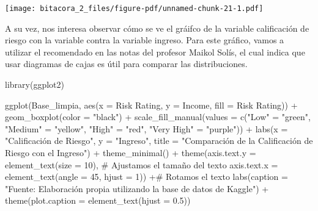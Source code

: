 \documentclass[
  letterpaper,
  DIV=11,
  numbers=noendperiod]{scrreprt}
\newenvironment{Shaded}{\begin{snugshade}}{\end{snugshade}}
\newcommand{\AttributeTok}[1]{\textcolor[rgb]{0.40,0.45,0.13}{#1}}
\newcommand{\CommentTok}[1]{\textcolor[rgb]{0.37,0.37,0.37}{#1}}
\newcommand{\DecValTok}[1]{\textcolor[rgb]{0.68,0.00,0.00}{#1}}
\newcommand{\FloatTok}[1]{\textcolor[rgb]{0.68,0.00,0.00}{#1}}
\newcommand{\FunctionTok}[1]{\textcolor[rgb]{0.28,0.35,0.67}{#1}}
\newcommand{\NormalTok}[1]{\textcolor[rgb]{0.00,0.23,0.31}{#1}}
\newcommand{\OtherTok}[1]{\textcolor[rgb]{0.00,0.23,0.31}{#1}}
\newcommand{\SpecialCharTok}[1]{\textcolor[rgb]{0.37,0.37,0.37}{#1}}
\newcommand{\StringTok}[1]{\textcolor[rgb]{0.13,0.47,0.30}{#1}}
\begin{document}
\texttt{[image: bitacora\_2\_files/figure-pdf/unnamed-chunk-21-1.pdf]}

A su vez, nos interesa observar cómo se ve el gráifco de la variable
calificación de riesgo con la variable contra la variable ingreso. Para
este gráfico, vamos a utilizar el recomendado en las notas del profesor
Maikol Solís, el cual indica que usar diagramas de cajas es útil para
comparar las distribuciones.

\begin{Shaded}
\begin{Highlighting}[]
\FunctionTok{library}\NormalTok{(ggplot2)}

\FunctionTok{ggplot}\NormalTok{(Base\_limpia, }\FunctionTok{aes}\NormalTok{(}\AttributeTok{x =} \StringTok{\textasciigrave{}}\AttributeTok{Risk Rating}\StringTok{\textasciigrave{}}\NormalTok{, }\AttributeTok{y =}\NormalTok{ Income, }\AttributeTok{fill =} \StringTok{\textasciigrave{}}\AttributeTok{Risk Rating}\StringTok{\textasciigrave{}}\NormalTok{)) }\SpecialCharTok{+}  
  \FunctionTok{geom\_boxplot}\NormalTok{(}\AttributeTok{color =} \StringTok{"black"}\NormalTok{) }\SpecialCharTok{+}  
  \FunctionTok{scale\_fill\_manual}\NormalTok{(}\AttributeTok{values =} \FunctionTok{c}\NormalTok{(}\StringTok{"Low"} \OtherTok{=} \StringTok{"green"}\NormalTok{, }\StringTok{"Medium"} \OtherTok{=} \StringTok{"yellow"}\NormalTok{, }\StringTok{"High"} \OtherTok{=} \StringTok{"red"}\NormalTok{, }\StringTok{"Very High"} \OtherTok{=} \StringTok{"purple"}\NormalTok{)) }\SpecialCharTok{+}  
  \FunctionTok{labs}\NormalTok{(}\AttributeTok{x =} \StringTok{"Calificación de Riesgo"}\NormalTok{, }\AttributeTok{y =} \StringTok{"Ingreso"}\NormalTok{, }\AttributeTok{title =} \StringTok{"Comparación de la Calificación de Riesgo con el Ingreso"}\NormalTok{) }\SpecialCharTok{+} 
  \FunctionTok{theme\_minimal}\NormalTok{() }\SpecialCharTok{+}
  \FunctionTok{theme}\NormalTok{(}\AttributeTok{axis.text.y =} \FunctionTok{element\_text}\NormalTok{(}\AttributeTok{size =} \DecValTok{10}\NormalTok{), }\CommentTok{\# Ajustamos el tamaño del texto}
        \AttributeTok{axis.text.x =} \FunctionTok{element\_text}\NormalTok{(}\AttributeTok{angle =} \DecValTok{45}\NormalTok{, }\AttributeTok{hjust =} \DecValTok{1}\NormalTok{))  }\SpecialCharTok{+}\CommentTok{\# Rotamos el texto}
  \FunctionTok{labs}\NormalTok{(}\AttributeTok{caption =} \StringTok{"Fuente: Elaboración propia utilizando la base de datos de Kaggle"}\NormalTok{) }\SpecialCharTok{+}
\FunctionTok{theme}\NormalTok{(}\AttributeTok{plot.caption =} \FunctionTok{element\_text}\NormalTok{(}\AttributeTok{hjust =} \FloatTok{0.5}\NormalTok{)) }
\end{Highlighting}
\end{Shaded}
\end{document}
